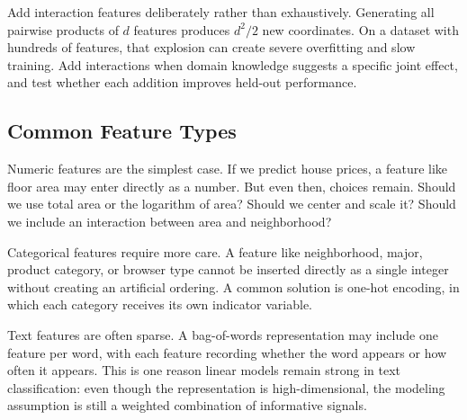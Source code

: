 \begin{practicalnote}
Add interaction features deliberately rather than exhaustively. Generating all pairwise products of $d$ features produces $d^2/2$ new coordinates. On a dataset with hundreds of features, that explosion can create severe overfitting and slow training. Add interactions when domain knowledge suggests a specific joint effect, and test whether each addition improves held-out performance.
\end{practicalnote}

\subsection{Common Feature Types}

Numeric features are the simplest case. If we predict house prices, a feature like floor area may enter directly as a number. But even then, choices remain. Should we use total area or the logarithm of area? Should we center and scale it? Should we include an interaction between area and neighborhood?

Categorical features require more care. A feature like neighborhood, major, product category, or browser type cannot be inserted directly as a single integer without creating an artificial ordering. A common solution is one-hot encoding, in which each category receives its own indicator variable.

Text features are often sparse. A bag-of-words representation may include one feature per word, with each feature recording whether the word appears or how often it appears. This is one reason linear models remain strong in text classification: even though the representation is high-dimensional, the modeling assumption is still a weighted combination of informative signals.

